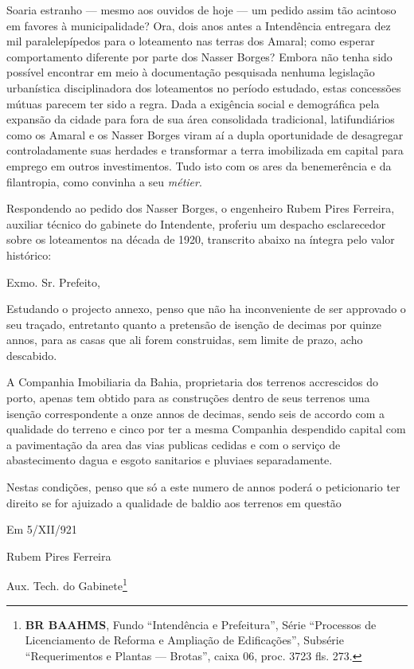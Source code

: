 Soaria estranho --- mesmo aos ouvidos de hoje --- um pedido assim tão acintoso em favores à municipalidade? Ora, dois anos antes a Intendência entregara dez mil paralelepípedos para o loteamento nas terras dos Amaral; como esperar comportamento diferente por parte dos Nasser Borges? Embora não tenha sido possível encontrar em meio à documentação pesquisada nenhuma legislação urbanística disciplinadora dos loteamentos no período estudado, estas concessões mútuas parecem ter sido a regra. Dada a exigência social e demográfica pela expansão da cidade para fora de sua área consolidada tradicional, latifundiários como os Amaral e os Nasser Borges viram aí a dupla oportunidade de desagregar controladamente suas herdades e transformar a terra imobilizada em capital para emprego em outros investimentos. Tudo isto com os ares da benemerência e da filantropia, como convinha a seu \textit{métier}.

Respondendo ao pedido dos Nasser Borges, o engenheiro Rubem Pires Ferreira, auxiliar técnico do gabinete do Intendente, proferiu um despacho esclarecedor sobre os loteamentos na década de 1920, transcrito abaixo na íntegra pelo valor histórico:

\begin{citacao}
Exmo. Sr. Prefeito,

Estudando o projecto annexo, penso que não ha inconveniente de ser approvado o seu traçado, entretanto quanto a pretensão de isenção de decimas por quinze annos, para as casas que ali forem construidas, sem limite de prazo, acho descabido.

A Companhia Imobiliaria da Bahia, proprietaria dos terrenos accrescidos do porto, apenas tem obtido para as construções dentro de seus terrenos uma isenção correspondente a onze annos de decimas, sendo seis de accordo com a qualidade do terreno e cinco por ter a mesma Companhia despendido capital com a pavimentação da area das vias publicas cedidas e com o serviço de abastecimento dagua e esgoto sanitarios e pluviaes separadamente.

Nestas condições, penso que só a este numero de annos poderá o peticionario ter direito se for ajuizado a qualidade de baldio aos terrenos em questão

Em 5/XII/921

Rubem Pires Ferreira

Aux. Tech. do Gabinete\footnote{\textbf{BR BAAHMS}, Fundo ``Intendência e Prefeitura'', Série ``Processos de Licenciamento de Reforma e Ampliação de Edificações'', Subsérie ``Requerimentos e Plantas --- Brotas'', caixa 06, proc. 3723 fls. 273.}
\end{citacao}

